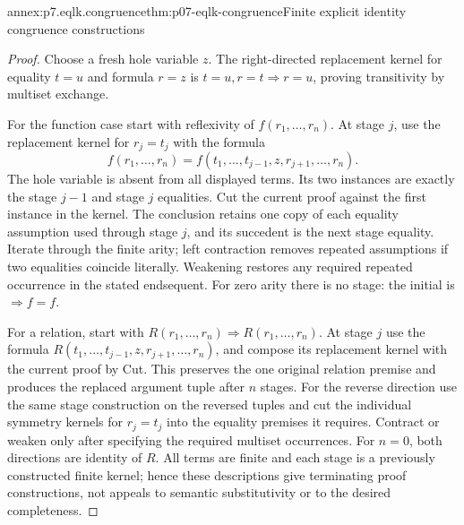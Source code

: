 \begin{annexitem}{annex:p7.eqlk.congruence}{thm:p07-eqlk-congruence}{Finite explicit identity congruence constructions}
\begin{proof}
Choose a fresh hole variable \(z\). The right-directed replacement kernel
for equality \(t=u\) and formula \(r=z\) is
\(t=u,r=t\Rightarrow r=u\), proving transitivity by multiset exchange.

For the function case start with reflexivity of
\(f(r_1,\ldots,r_n)\). At stage \(j\), use the replacement kernel
for \(r_j=t_j\) with the formula
\[
 f(r_1,\ldots,r_n)
   =f(t_1,\ldots,t_{j-1},z,r_{j+1},\ldots,r_n).
\]
The hole variable is absent from all displayed terms. Its two instances
are exactly the stage \(j-1\) and stage \(j\) equalities. Cut the current
proof against the first instance in the kernel. The conclusion retains
one copy of each equality assumption used through stage \(j\), and
its succedent is the next stage equality. Iterate through the finite
arity; left contraction removes repeated assumptions if two equalities
coincide literally. Weakening restores any required repeated occurrence
in the stated endsequent. For zero arity there is no stage: the initial
is \(\Rightarrow f=f\).

For a relation, start with \(R(r_1,\ldots,r_n)\Rightarrow
R(r_1,\ldots,r_n)\). At stage \(j\) use the formula
\(R(t_1,\ldots,t_{j-1},z,r_{j+1},\ldots,r_n)\), and compose
its replacement kernel with the current proof by Cut. This preserves
the one original relation premise and produces the replaced argument
tuple after \(n\) stages. For the reverse direction use the same
stage construction on the reversed tuples and cut the individual
symmetry kernels for \(r_j=t_j\) into the equality premises it requires.
Contract or weaken only after specifying the required multiset
occurrences. For \(n=0\), both directions are identity of \(R\).
All terms are finite and each stage is a previously constructed finite
kernel; hence these descriptions give terminating proof constructions,
not appeals to semantic substitutivity or to the desired completeness.
\end{proof}
\end{annexitem}

